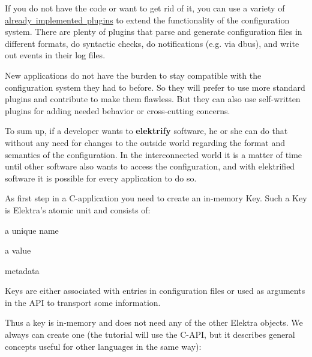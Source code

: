 If you do not have the code or want to get rid of it, you can use a variety of \mbox{\hyperlink{src_plugins_README_md}{already implemented plugins}} to extend the functionality of the configuration system. There are plenty of plugins that parse and generate configuration files in different formats, do syntactic checks, do notifications (e.\+g. via dbus), and write out events in their log files.

New applications do not have the burden to stay compatible with the configuration system they had to before. So they will prefer to use more standard plugins and contribute to make them flawless. But they can also use self-\/written plugins for adding needed behavior or cross-\/cutting concerns.

To sum up, if a developer wants to {\bfseries{elektrify}} software, he or she can do that without any need for changes to the outside world regarding the format and semantics of the configuration. In the interconnected world it is a matter of time until other software also wants to access the configuration, and with elektrified software it is possible for every application to do so.

As first step in a C-\/application you need to create an in-\/memory {\ttfamily Key}. Such a {\ttfamily Key} is Elektra’s atomic unit and consists of\+:


\begin{DoxyItemize}
\item a unique name
\item a value
\item metadata
\end{DoxyItemize}

{\ttfamily Key}s are either associated with entries in configuration files or used as arguments in the A\+PI to transport some information.

Thus a key is in-\/memory and does not need any of the other Elektra objects. We always can create one (the tutorial will use the C-\/\+A\+PI, but it describes general concepts useful for other languages in the same way)\+:


\begin{DoxyCode}{0}
\end{DoxyCode}



